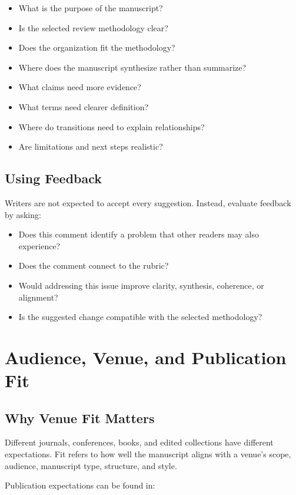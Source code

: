 \documentclass[11pt]{article}
\begin{document}
\begin{itemize}
  \item What is the purpose of the manuscript?
  \item Is the selected review methodology clear?
  \item Does the organization fit the methodology?
  \item Where does the manuscript synthesize rather than summarize?
  \item What claims need more evidence?
  \item What terms need clearer definition?
  \item Where do transitions need to explain relationships?
  \item Are limitations and next steps realistic?
\end{itemize}

\subsection{Using Feedback}

Writers are not expected to accept every suggestion. Instead, evaluate feedback by asking:

\begin{itemize}
  \item Does this comment identify a problem that other readers may also experience?
  \item Does the comment connect to the rubric?
  \item Would addressing this issue improve clarity, synthesis, coherence, or alignment?
  \item Is the suggested change compatible with the selected methodology?
\end{itemize}

\section{Audience, Venue, and Publication Fit}

\subsection{Why Venue Fit Matters}

Different journals, conferences, books, and edited collections have different expectations. Fit refers to how well the manuscript aligns with a venue's scope, audience, manuscript type, structure, and style.

Publication expectations can be found in:
\end{document}
